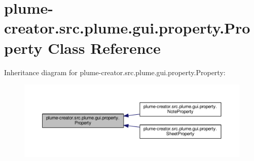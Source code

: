\hypertarget{classplume-creator_1_1src_1_1plume_1_1gui_1_1property_1_1_property}{}\section{plume-\/creator.src.\+plume.\+gui.\+property.\+Property Class Reference}
\label{classplume-creator_1_1src_1_1plume_1_1gui_1_1property_1_1_property}


Inheritance diagram for plume-\/creator.src.\+plume.\+gui.\+property.\+Property\+:\nopagebreak
\begin{figure}[H]
\begin{center}
\leavevmode
\includegraphics[width=350pt]{classplume-creator_1_1src_1_1plume_1_1gui_1_1property_1_1_property__inherit__graph}
\end{center}
\end{figure}
